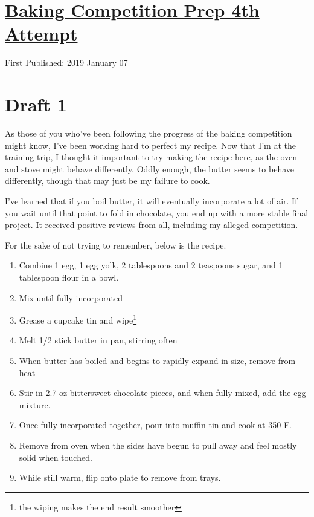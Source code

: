 \documentclass[12pt]{article}[titlepage]
\newcommand{\1}{\={a}}
\newcommand{\2}{\={e}}
\newcommand{\3}{\={\i}}
\newcommand{\4}{\=o}
\newcommand{\5}{\=u}
\newcommand{\6}{\={A}}
\renewcommand{\,}{\textsuperscript{,}}
\begin{document}
\doublespacing
\section{\href{baking-take-four.html}{Baking Competition Prep 4th Attempt}}
First Published: 2019 January 07
\section{Draft 1}
As those of you who've been following the progress of the baking competition might know, I've been working hard to perfect my recipe.
Now that I'm at the training trip, I thought it important to try making the recipe here, as the oven and stove might behave differently.
Oddly enough, the butter seems to behave differently, though that may just be my failure to cook.

I've learned that if you boil butter, it will eventually incorporate a lot of air.
If you wait until that point to fold in chocolate, you end up with a more stable final project.
It received positive reviews from all, including my alleged competition.

For the sake of not trying to remember, below is the recipe.

\begin{enumerate}
\item Combine 1 egg, 1 egg yolk, 2 tablespoons and 2 teaspoons sugar, and 1 tablespoon flour in a bowl.
\item Mix until fully incorporated
\item Grease a cupcake tin and wipe\footnote{the wiping makes the end result smoother}
\item Melt 1/2 stick butter in pan, stirring often
\item When butter has boiled and begins to rapidly expand in size, remove from heat
\item Stir in 2.7 oz bittersweet chocolate pieces, and when fully mixed, add the egg mixture.
\item Once fully incorporated together, pour into muffin tin and cook at 350 F.
\item Remove from oven when the sides have begun to pull away and feel mostly solid when touched.
\item While still warm, flip onto plate to remove from trays.
\end{enumerate}
\end{document}
